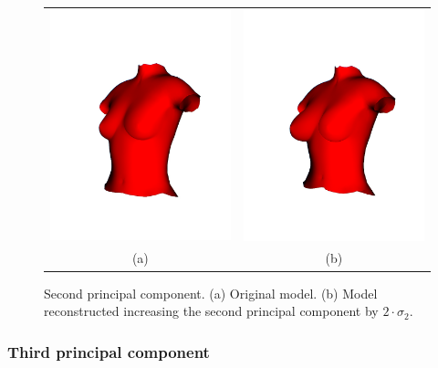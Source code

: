 \begin{figure}[H]
    \centering
    \begin{tabular}{@{}cc@{}}
        \includegraphics[width=0.487\linewidth]{figures/20230529-pca_base.jpg}&
        \includegraphics[width=0.487\linewidth]{figures/20230529-pca_1_comp.jpg}\\
        (a)&(b)\\
        \end{tabular}
    \caption[Second principal component]{Second principal component.
    \textup{(a)} Original model.
    \textup{(b)} Model reconstructed increasing the second principal component by $2 \cdot \sigma_2$.
    }

    \label{fig:pca_1}
\end{figure}


\subsubsection{Third principal component}

